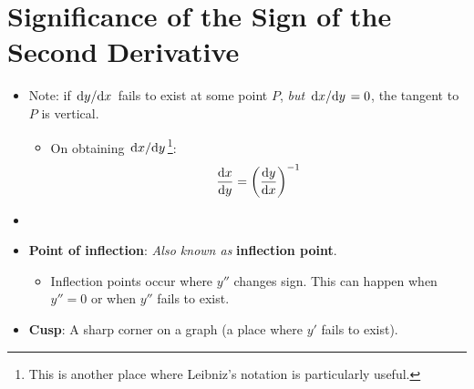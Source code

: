 \documentclass[../main.tex]{subfiles}
\begin{document}
\section{Significance of the Sign of the Second Derivative}
\begin{itemize}
    \item Note: if $\dv*{y}{x}$ fails to exist at some point $P$, \emph{but} $\dv*{x}{y}=0$, the tangent to $P$ is vertical.
    \begin{itemize}
        \item On obtaining $\dv*{x}{y}$\footnote{This is another place where Leibniz's notation is particularly useful.}:
        \begin{equation*}
            \dv{x}{y} = \left( \dv{y}{x} \right)^{-1}
        \end{equation*}
    \end{itemize}
    \item {}
    \item \textbf{Point of inflection}:  \emph{Also known as} \textbf{inflection point}.
    \begin{itemize}
        \item Inflection points occur where $y''$ changes sign. This can happen when $y''=0$ or when $y''$ fails to exist.
    \end{itemize}
    \item \textbf{Cusp}: A sharp corner on a graph (a place where $y'$ fails to exist).
\end{itemize}
\end{document}
